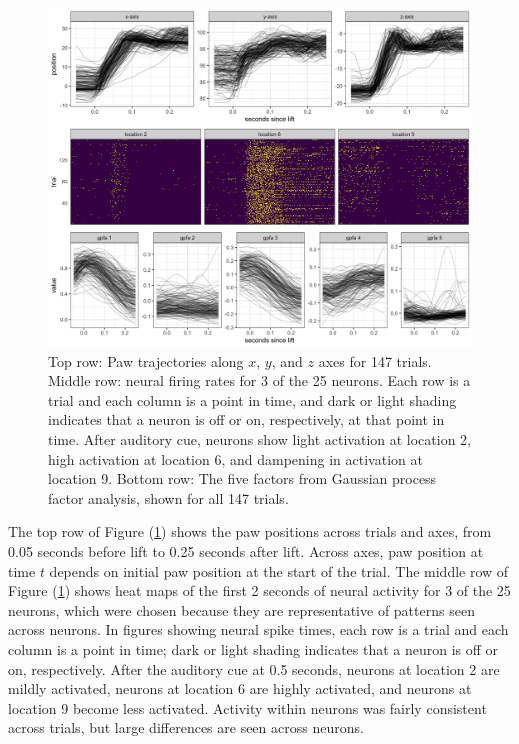 \documentclass[preprint]{JASA}
\begin{document}
\begin{figure}
\includegraphics[width=\reprintcolumnwidth]{figs/fig_data_eda-1} \caption{Top row: Paw trajectories along $x$, $y$, and $z$ axes for 147 trials. Middle row: neural firing rates for 3 of the 25 neurons. Each row is a trial and each column is a point in time, and dark or light shading indicates that a neuron is off or on, respectively, at that point in time. After auditory cue, neurons show light activation at location 2, high activation at location 6, and dampening in activation at location 9. Bottom row: The five factors from Gaussian process factor analysis, shown for all 147 trials.}\label{fig:flode_data}
\end{figure}

The top row of Figure (\ref{fig:flode_data}) shows the paw positions
across trials and axes, from 0.05 seconds before lift to 0.25 seconds
after lift. Across axes, paw position at time \(t\) depends on initial
paw position at the start of the trial. The middle row of Figure
(\ref{fig:flode_data}) shows heat maps of the first 2 seconds of neural
activity for 3 of the 25 neurons, which were chosen because they are
representative of patterns seen across neurons. In figures showing
neural spike times, each row is a trial and each column is a point in
time; dark or light shading indicates that a neuron is off or on,
respectively. After the auditory cue at 0.5 seconds, neurons at location
2 are mildly activated, neurons at location 6 are highly activated, and
neurons at location 9 become less activated. Activity within neurons was
fairly consistent across trials, but large differences are seen across
neurons.
\end{document}
